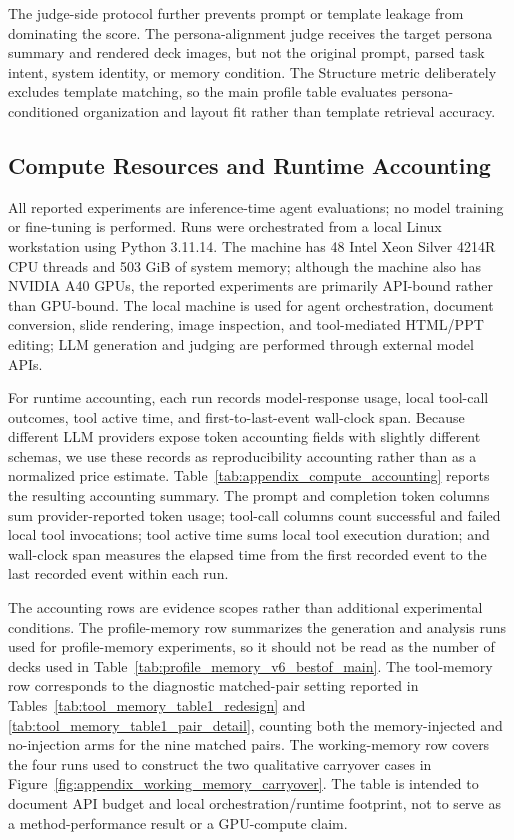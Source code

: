 \documentclass{llmxive}
\begin{document}
The judge-side protocol further prevents prompt or template leakage from
dominating the score. The persona-alignment judge receives the target persona
summary and rendered deck images, but not the original prompt, parsed task
intent, system identity, or memory condition. The Structure metric deliberately
excludes template matching, so the main profile table evaluates
persona-conditioned organization and layout fit rather than template retrieval
accuracy.

\subsection{Compute Resources and Runtime Accounting}
\label{app:compute_resources}

All reported experiments are inference-time agent evaluations; no model
training or fine-tuning is performed. Runs were orchestrated from a local
Linux workstation using Python 3.11.14. The machine has 48 Intel Xeon Silver
4214R CPU threads and 503 GiB of system memory; although the machine also has
NVIDIA A40 GPUs, the reported experiments are primarily API-bound rather than
GPU-bound. The local machine is used for agent orchestration, document
conversion, slide rendering, image inspection, and tool-mediated HTML/PPT
editing; LLM generation and judging are performed through external model APIs.

For runtime accounting, each run records model-response usage, local tool-call
outcomes, tool active time, and first-to-last-event wall-clock span. Because
different LLM providers expose token accounting fields with slightly different
schemas, we use these records as reproducibility accounting rather than as a
normalized price estimate. Table~\ref{tab:appendix_compute_accounting} reports
the resulting accounting summary. The prompt and completion token columns sum
provider-reported token usage; tool-call columns count successful and failed
local tool invocations; tool active time sums local tool execution duration; and
wall-clock span measures the elapsed time from the first recorded event to the
last recorded event within each run.

The accounting rows are evidence scopes rather than additional experimental
conditions. The profile-memory row summarizes the generation and analysis runs
used for profile-memory experiments, so it should not be read as the number of
decks used in Table~\ref{tab:profile_memory_v6_bestof_main}.
The tool-memory row corresponds to the diagnostic matched-pair setting reported
in Tables~\ref{tab:tool_memory_table1_redesign} and
\ref{tab:tool_memory_table1_pair_detail}, counting both the memory-injected and
no-injection arms for the nine matched pairs. The working-memory row covers the
four runs used to construct the two qualitative carryover cases in
Figure~\ref{fig:appendix_working_memory_carryover}. The table is intended to
document API budget and local orchestration/runtime footprint, not to serve as a
method-performance result or a GPU-compute claim.
\end{document}
